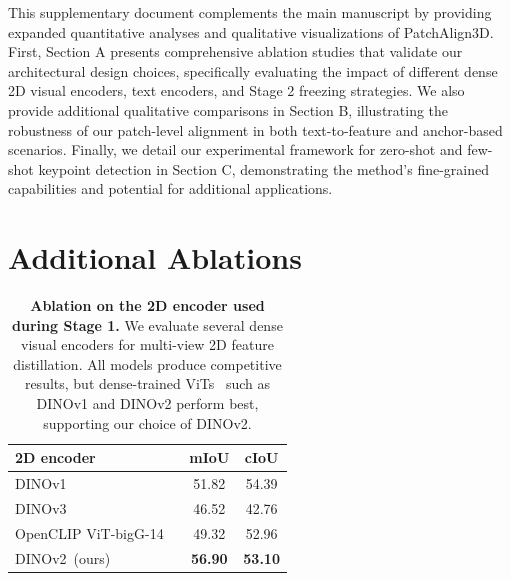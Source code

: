 \maketitlesupplementary
\setcounter{figure}{5}
\setcounter{table}{6} 

This supplementary document complements the main manuscript by providing expanded quantitative analyses and qualitative visualizations of PatchAlign3D. First, Section A presents comprehensive ablation studies that validate our architectural design choices, specifically evaluating the impact of different dense 2D visual encoders, text encoders, and Stage 2 freezing strategies. We also provide additional qualitative comparisons in Section B, illustrating the robustness of our patch-level alignment in both text-to-feature and anchor-based scenarios. Finally, we detail our experimental framework for zero-shot and few-shot keypoint detection in Section C, demonstrating the method's fine-grained capabilities and potential for additional applications.

\section{Additional Ablations}


\begin{table}[t]
    \centering
    \begin{tabular}{lcc}
        \toprule
        2D encoder & mIoU & cIoU \\
        \midrule
        DINOv1~\cite{caron2021emerging} & 51.82 & 54.39 \\
        DINOv3~\cite{simeoni2025dinov3} & 46.52 & 42.76 \\
        OpenCLIP ViT-bigG-14 ~\cite{radford2021learning}& 49.32 & 52.96 \\
        DINOv2~\cite{oquab2023dinov2}(ours) & \textbf{56.90} & \textbf{53.10} \\
        \bottomrule
    \end{tabular}
    \caption{\textbf{Ablation on the 2D encoder used during Stage 1.}
    We evaluate several dense visual encoders for multi-view 2D feature distillation.
    All models produce competitive results, but dense-trained ViTs~\cite{dosovitskiy2020image} such as
    DINOv1 and DINOv2 perform best, supporting our choice of DINOv2.}
    \label{tab:2d_encoder_ablation}
\end{table}

